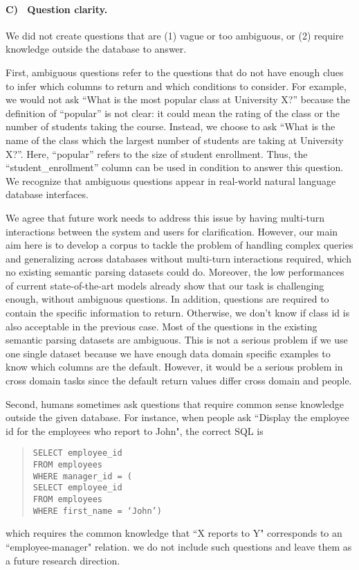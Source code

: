 \documentclass[11pt,a4paper]{article}
\begin{document}
\paragraph{C)~ Question clarity.}
We did not create questions that are (1) vague or too ambiguous, or (2) require knowledge outside the database to answer.

First, ambiguous questions refer to the questions that do not have enough clues to infer which columns to return and which conditions to consider. 
For example, we would not ask ``What is the most popular class at University X?'' because the definition of ``popular'' is not clear: it could mean the rating of the class or the number of students taking the course.
Instead, we choose to ask ``What is the name of the class which the largest number of students are taking at University X?''. Here, ``popular'' refers to the size of student enrollment. Thus, the ``student\_enrollment'' column can be used in condition to answer this question.
We recognize that ambiguous questions appear in real-world natural language database interfaces. 

We agree that future work needs to address this issue by having multi-turn interactions between the system and users for clarification. However, our main aim here is to develop a corpus to tackle the problem of handling complex queries and generalizing across databases without multi-turn interactions required, which no existing semantic parsing datasets could do. Moreover, the low performances of current state-of-the-art models already show that our task is challenging enough, without ambiguous questions.
In addition, questions are required to contain the specific information to return.
Otherwise, we don't know if class id is also acceptable in the previous case. Most of the questions in the existing semantic parsing datasets are ambiguous. This is not a serious problem if we use one single dataset because we have enough data domain specific examples to know which columns are the default.
However, it would be a serious problem in cross domain tasks since the default return values differ cross domain and people.

Second, humans sometimes ask questions that require common sense knowledge outside the given database.
For instance, when people ask ``Display the employee id for the employees who report to John", the correct SQL is
\begin{quote}
\texttt{SELECT employee\_id \\ FROM employees \\ WHERE manager\_id = (\\ SELECT employee\_id \\ FROM employees \\ \quad WHERE first\_name = `John')}
\end{quote}
which requires the common knowledge that ``X reports to Y" corresponds to an ``employee-manager" relation.
we do not include such questions and leave them as a future research direction.
\end{document}
